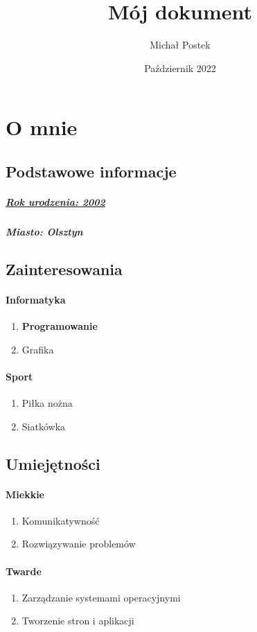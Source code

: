 \documentclass[a4paper]{article}
\title{Mój dokument}
\author{Michał Postek}
\date{Październik 2022}
\begin{document}
\maketitle
\section{O mnie}

\subsection{Podstawowe informacje}
\subparagraph{\underline{Rok urodzenia: 2002}}
\subparagraph{Miasto: Olsztyn}

\subsection{Zainteresowania}
\paragraph{Informatyka}
\begin{enumerate}
\item \textbf{Programowanie}
\item Grafika
\end{enumerate}
\paragraph{Sport}
\begin{enumerate}
\item Piłka nożna
\item Siatkówka
\end{enumerate}

\subsection{Umiejętności}
\paragraph{Miekkie}
\begin{enumerate}
\item Komunikatywność
\item Rozwiązywanie problemów
\end{enumerate}
\paragraph{Twarde}
\begin{enumerate}
\item Zarządzanie systemami operacyjnymi
\item Tworzenie stron i aplikacji
\end{enumerate}
\end{document}
